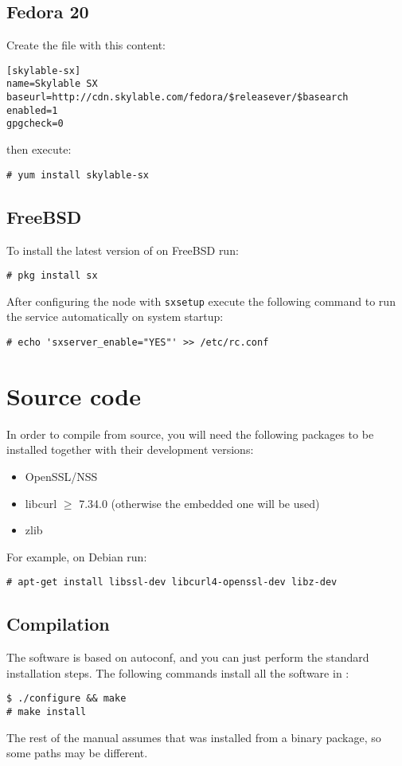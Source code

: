 \subsection{Fedora 20}
Create the file  with this content:
\begin{lstlisting}
[skylable-sx]
name=Skylable SX
baseurl=http://cdn.skylable.com/fedora/$releasever/$basearch
enabled=1
gpgcheck=0
\end{lstlisting}
then execute:
\begin{lstlisting}
# yum install skylable-sx
\end{lstlisting}

\subsection{FreeBSD}
To install the latest version of \SX on FreeBSD run:
\begin{lstlisting}
# pkg install sx
\end{lstlisting}
After configuring the node with \verb+sxsetup+ execute the following
command to run the service automatically on system startup:
\begin{lstlisting}
# echo 'sxserver_enable="YES"' >> /etc/rc.conf
\end{lstlisting}

\section{Source code}
In order to compile \SX from source, you will need the following packages to
be installed together with their development versions:
\begin{itemize}
    \item OpenSSL/NSS
    \item libcurl $\ge$ 7.34.0 (otherwise the embedded one will be used)
    \item zlib
\end{itemize}
For example, on Debian run:
\begin{lstlisting}
# apt-get install libssl-dev libcurl4-openssl-dev libz-dev
\end{lstlisting}

\subsection{Compilation}
The software is based on autoconf, and you can just perform the standard
installation steps. The following commands install all the software in
:
\begin{lstlisting}
$ ./configure && make
# make install
\end{lstlisting}
The rest of the manual assumes that \SX was installed from a binary
package, so some paths may be different.

